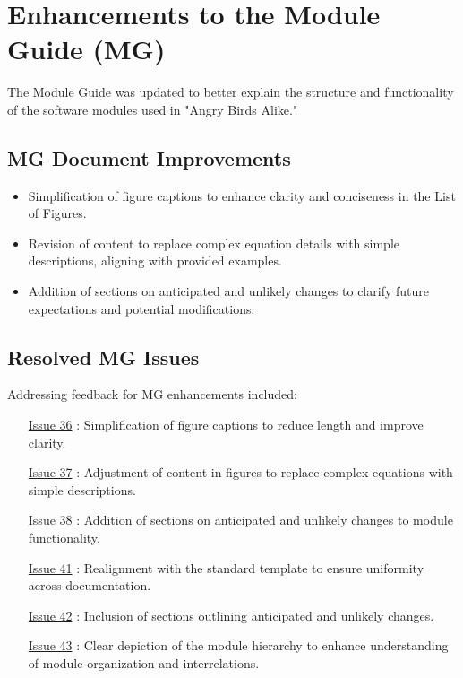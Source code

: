 \documentclass[12pt]{article}
\begin{document}
\section{Enhancements to the Module Guide (MG)}
The Module Guide was updated to better explain the structure and functionality of the software modules used in "Angry Birds Alike."

\subsection{MG Document Improvements}
\begin{itemize}
    \item Simplification of figure captions to enhance clarity and conciseness in the List of Figures.
    \item Revision of content to replace complex equation details with simple descriptions, aligning with provided examples.
    \item Addition of sections on anticipated and unlikely changes to clarify future expectations and potential modifications.
\end{itemize}

\subsection{Resolved MG Issues}
Addressing feedback for MG enhancements included:
\begin{itemize}
    \item [\href{https://github.com/XessX/Angry_Bird_Alike/issues/36}{Issue 36}]: Simplification of figure captions to reduce length and improve clarity.
    \item [\href{https://github.com/XessX/Angry_Bird_Alike/issues/37}{Issue 37}]: Adjustment of content in figures to replace complex equations with simple descriptions.
    \item [\href{https://github.com/XessX/Angry_Bird_Alike/issues/38}{Issue 38}]: Addition of sections on anticipated and unlikely changes to module functionality.
    \item [\href{https://github.com/XessX/Angry_Bird_Alike/issues/41}{Issue 41}]: Realignment with the standard template to ensure uniformity across documentation.
    \item [\href{https://github.com/XessX/Angry_Bird_Alike/issues/42}{Issue 42}]: Inclusion of sections outlining anticipated and unlikely changes.
    \item [\href{https://github.com/XessX/Angry_Bird_Alike/issues/43}{Issue 43}]: Clear depiction of the module hierarchy to enhance understanding of module organization and interrelations.
\end{itemize}
\end{document}
